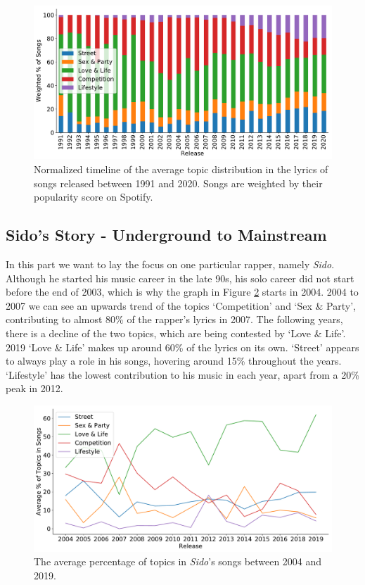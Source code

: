 \documentclass[conference]{IEEEtran}
\begin{document}
\begin{figure}[!t]
\includegraphics[width=\linewidth]{figures/w_timeline.pdf}
\vspace*{-8mm}
\caption{Normalized timeline of the average topic distribution in the lyrics of songs released between 1991 and 2020. Songs are weighted by their popularity score on Spotify.}
\label{fig:w_timeline}
\end{figure}

\subsection{Sido's Story - Underground to Mainstream}
In this part we want to lay the focus on one particular rapper, namely \textit{Sido}. Although he started his music career in the late 90s, his solo career did not start before the end of 2003, which is why the graph in Figure \ref{fig:sido} starts in 2004. 2004 to 2007 we can see an upwards trend of the topics {\lq}Competition{\rq} and {\lq}Sex \& Party{\rq}, contributing to almost 80\% of the rapper's lyrics in 2007. The following years, there is a decline of the two topics, which are being contested by {\lq}Love \& Life{\rq}. 2019 {\lq}Love \& Life{\rq} makes up around 60\% of the lyrics on its own. {\lq}Street{\rq} appears to always play a role in his songs, hovering around 15\% throughout the years. {\lq}Lifestyle{\rq} has the lowest contribution to his music in each year, apart from a 20\% peak in 2012.

\begin{figure}[!t]
\includegraphics[width=\linewidth]{figures/sido.pdf}
\vspace*{-8mm}
\caption{The average percentage of topics in \textit{Sido}'s songs between 2004 and 2019.}
\label{fig:sido}
\end{figure}
\end{document}
